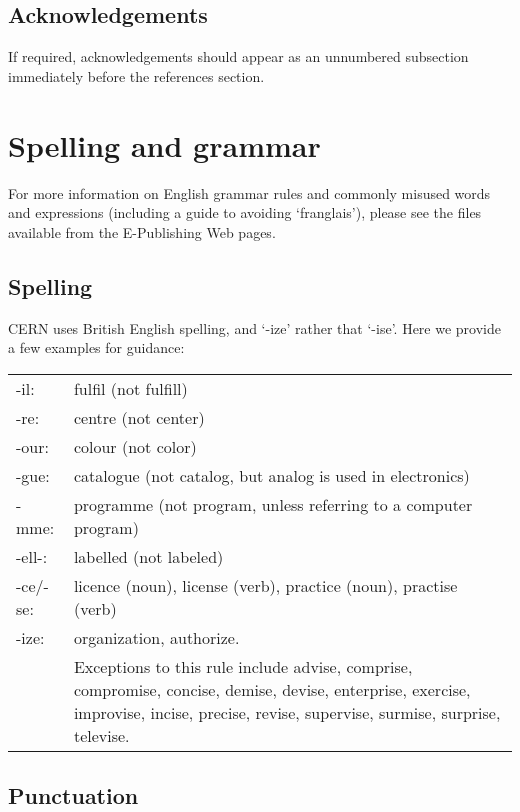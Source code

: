 \documentclass{cernrep}
\begin{document}
\subsection{Acknowledgements}

If required, acknowledgements should appear as an unnumbered
subsection immediately before the references section.

\section{Spelling and grammar}

For more information on English grammar rules and commonly misused
words and expressions (including a guide to avoiding `franglais'),
please see the files available from the E-Publishing Web pages.

\subsection{Spelling}

CERN uses British English spelling, and `-ize' rather that
`-ise'. Here we provide a few examples for guidance:
\begin{flushleft}
\begin{tabularx}{\linewidth}{@{}lX}
-il:     & fulfil (not fulfill) \\
-re:     & centre (not center) \\
-our:    & colour (not color) \\ 
-gue:    & catalogue (not catalog, but analog is used in electronics) \\ 
-mme:    & programme (not program, unless referring to a computer
           program) \\ 
-ell-:   & labelled (not labeled) \\ 
-ce/-se: & licence (noun), license (verb), practice (noun), practise (verb) \\ 
-ize:    & organization, authorize. \\
         & Exceptions to this rule include advise, comprise, compromise, 
           concise, demise, devise, enterprise, exercise, improvise, 
           incise, precise, revise, supervise, surmise, surprise, televise.\\
\end{tabularx}
\end{flushleft}

\subsection{Punctuation}
\end{document}
